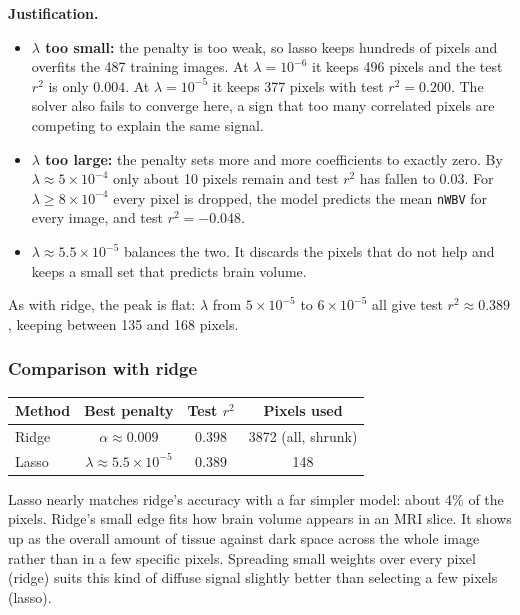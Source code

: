 \documentclass[11pt]{article}
\begin{document}
\textbf{Justification.}
\begin{itemize}
  \item \textbf{$\lambda$ too small:} the penalty is too weak, so lasso keeps hundreds of
  pixels and overfits the 487 training images. At $\lambda = 10^{-6}$ it keeps 496 pixels
  and the test $r^2$ is only $0.004$. At $\lambda = 10^{-5}$ it keeps 377 pixels with test
  $r^2 = 0.200$. The solver also fails to converge here, a sign that too many correlated
  pixels are competing to explain the same signal.
  \item \textbf{$\lambda$ too large:} the penalty sets more and more coefficients to exactly
  zero. By $\lambda \approx 5 \times 10^{-4}$ only about 10 pixels remain and test $r^2$ has
  fallen to $0.03$. For $\lambda \ge 8 \times 10^{-4}$ every pixel is dropped, the model
  predicts the mean \texttt{nWBV} for every image, and test $r^2 = -0.048$.
  \item \textbf{$\lambda \approx 5.5 \times 10^{-5}$} balances the two. It discards the pixels
  that do not help and keeps a small set that predicts brain volume.
\end{itemize}
As with ridge, the peak is flat: $\lambda$ from $5 \times 10^{-5}$ to $6 \times 10^{-5}$
all give test $r^2 \approx 0.389$, keeping between 135 and 168 pixels.

\subsubsection*{Comparison with ridge}

\begin{center}
\begin{tabular}{lccc}
\toprule
Method & Best penalty & Test $r^2$ & Pixels used \\
\midrule
Ridge & $\alpha \approx 0.009$             & $0.398$ & 3872 (all, shrunk) \\
Lasso & $\lambda \approx 5.5\times10^{-5}$ & $0.389$ & 148 \\
\bottomrule
\end{tabular}
\end{center}

Lasso nearly matches ridge's accuracy with a far simpler model: about 4\% of the
pixels. Ridge's small edge fits how brain volume appears in an MRI slice. It shows up
as the overall amount of tissue against dark space across the whole image rather than
in a few specific pixels. Spreading small weights over every pixel (ridge) suits this
kind of diffuse signal slightly better than selecting a few pixels (lasso).
\end{document}
